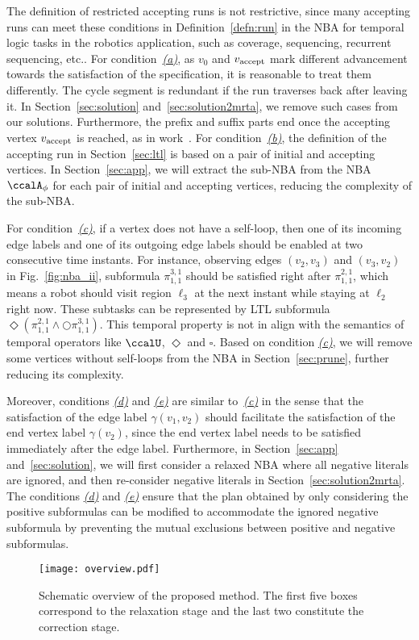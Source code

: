 \documentclass[Afour,sageh,times]{sagej}
\newcommand{\autop}{\ccalA_{\phi}}
\newcommand{\vertex}[1]{v_{\textup{#1}}}
\renewcommand{\ap}[3]{\mathcal{\pi}_{{#1},{#2}}^{#3}}
\begin{document}
The definition of restricted accepting runs is not restrictive, since many accepting runs can meet these conditions in Definition~\ref{defn:run} in the NBA for temporal logic tasks in the robotics application, such as coverage, sequencing, recurrent sequencing, etc..
For condition~\hyperref[cond:a]{\it (a)}, as $v_0$ and $\vertex{accept}$ mark different advancement towards the satisfaction of the specification, it is reasonable to treat them  differently. The cycle segment is redundant if the run traverses back after leaving it.  In Section~\ref{sec:solution} and~\ref{sec:solution2mrta}, we remove such cases from our solutions.  Furthermore, the prefix and suffix parts end once the accepting vertex $\vertex{accept}$ is reached, as in work~\cite{smith2010optimal}.
      For condition~\hyperref[cond:b]{\it (b)}, the definition of the accepting run in Section~\ref{sec:ltl} is based on a pair of initial and accepting vertices. In Section~\ref{sec:app}, we will extract the sub-NBA from the NBA $\autop$ for each pair of initial and accepting vertices, reducing the complexity of the sub-NBA.

      For condition~\hyperref[cond:c]{\it (c)}, if a vertex does not have a self-loop, then one of its incoming edge labels  and one of its outgoing edge labels  should be enabled at two consecutive time instants. For instance, observing edges $(v_2, v_3)$ and $(v_3, v_2)$ in Fig.~\ref{fig:nba_ii}, subformula $\ap{1}{1}{3,1}$ should be satisfied right after $\ap{1}{1}{2,1}$, which means a robot  should visit region $\ell_3$ at the next instant while staying at $\ell_2$ right now. These subtasks can be represented by LTL subformula $\Diamond(\ap{1}{1}{2,1} \wedge  \bigcirc \ap{1}{1}{3,1})$. This temporal property is not in align with the semantics of temporal operators like $\ccalU$, $\Diamond$ and $\square$. Based on condition \hyperref[cond:c]{\it (c)}, we will remove some vertices without self-loops from the NBA in Section~\ref{sec:prune}, further reducing its complexity.

      Moreover, conditions \hyperref[cond:d]{\it (d)} and \hyperref[cond:e]{\it (e)} are similar to~\hyperref[cond:c]{\it (c)} in the sense that  the satisfaction of the edge label $\gamma(v_1, v_2)$ should facilitate the satisfaction of the end vertex label $\gamma(v_2)$, since the end vertex label needs to be satisfied immediately after the edge label. Furthermore, in Section~\ref{sec:app} and~\ref{sec:solution}, we will first consider a relaxed NBA where all negative literals are ignored, and then re-consider negative literals in Section~\ref{sec:solution2mrta}. The conditions \hyperref[cond:d]{\it (d)} and \hyperref[cond:e]{\it (e)} ensure that the plan obtained by only considering the positive subformulas can be modified to accommodate the ignored negative subformula by preventing the mutual exclusions between positive and negative subformulas.
\begin{figure*}[!t]
   \centering
\texttt{[image: overview.pdf]}
   \caption{Schematic overview of the proposed method.  The first five boxes correspond to the relaxation stage and the last two constitute the correction stage.}
\label{fig:overview}
\end{figure*}
\end{document}
